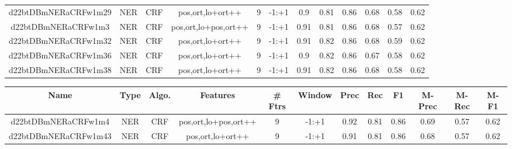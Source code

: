 \documentclass[a4paper]{article}
\begin{document}
\begin{landscape}
\begin{center}
\begin{tabular}{ |c|c|c|c|c|c|c|c|c|c|c|c|}
 	
 
 	
 		
 		\small{ d22btDBmNERaCRFw1m29 } & NER & CRF & pos,ort,lo+ort++  &  9 &  -1:+1  &  0.9 & 0.81 & 0.86  &  0.68 & 0.58 & 0.62 \\
 		

 	
 
 	
 		
 		\small{ d22btDBmNERaCRFw1m3 } & NER & CRF & pos,ort,lo+pos,ort++  &  9 &  -1:+1  &  0.91 & 0.81 & 0.86  &  0.68 & 0.57 & 0.62 \\
 		

 	
 
 	
 		
 		\small{ d22btDBmNERaCRFw1m32 } & NER & CRF & pos,ort,lo+ort++  &  9 &  -1:+1  &  0.91 & 0.82 & 0.86  &  0.68 & 0.59 & 0.62 \\
 		

 	
 
 	
 		
 		\small{ d22btDBmNERaCRFw1m36 } & NER & CRF & pos,ort,lo+ort++  &  9 &  -1:+1  &  0.9 & 0.82 & 0.86  &  0.67 & 0.58 & 0.62 \\
 		

 	
 
 	
 		
 		\small{ d22btDBmNERaCRFw1m38 } & NER & CRF & pos,ort,lo+ort++  &  9 &  -1:+1  &  0.91 & 0.82 & 0.86  &  0.68 & 0.58 & 0.62 \\
 		
 \hline
\end{tabular}
\end{center}




\begin{center}
\begin{tabular}{ |c|c|c|c|c|c|c|c|c|c|c|c|} 
 \hline
 	Name & Type & Algo. & Features & \# Ftrs & Window & Prec & Rec & F1 & M-Prec & M-Rec & M-F1\\
 \hline

 		

 	
 
 	
 		
 		\small{ d22btDBmNERaCRFw1m4 } & NER & CRF & pos,ort,lo+pos,ort++  &  9 &  -1:+1  &  0.92 & 0.81 & 0.86  &  0.69 & 0.57 & 0.62 \\
 		

 	
 
 	
 		
 		\small{ d22btDBmNERaCRFw1m43 } & NER & CRF & pos,ort,lo+ort++  &  9 &  -1:+1  &  0.91 & 0.81 & 0.86  &  0.68 & 0.57 & 0.62 \\
 		


\end{tabular}
\end{center}
\end{landscape}
\end{document}
